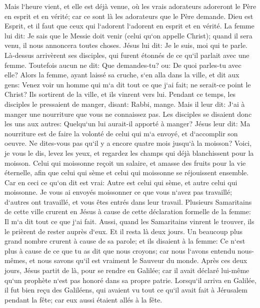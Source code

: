 \verse Mais l`heure vient, et elle est déjà venue, où les vrais adorateurs adoreront le Père en esprit et en vérité; car ce sont là les adorateurs que le Père demande. 
\verse Dieu est Esprit, et il faut que ceux qui l`adorent l`adorent en esprit et en vérité. 
\verse La femme lui dit: Je sais que le Messie doit venir (celui qu`on appelle Christ); quand il sera venu, il nous annoncera toutes choses. 
\verse Jésus lui dit: Je le suis, moi qui te parle. 
\verse Là-dessus arrivèrent ses disciples, qui furent étonnés de ce qu`il parlait avec une femme. Toutefois aucun ne dit: Que demandes-tu? ou: De quoi parles-tu avec elle? 
\verse Alors la femme, ayant laissé sa cruche, s`en alla dans la ville, et dit aux gens: 
\verse Venez voir un homme qui m`a dit tout ce que j`ai fait; ne serait-ce point le Christ? 
\verse Ils sortirent de la ville, et ils vinrent vers lui. 
\verse Pendant ce temps, les disciples le pressaient de manger, disant: Rabbi, mange. 
\verse Mais il leur dit: J`ai à manger une nourriture que vous ne connaissez pas. 
\verse Les disciples se disaient donc les uns aux autres: Quelqu`un lui aurait-il apporté à manger? 
\verse Jésus leur dit: Ma nourriture est de faire la volonté de celui qui m`a envoyé, et d`accomplir son oeuvre. 
\verse Ne dites-vous pas qu`il y a encore quatre mois jusqu`à la moisson? Voici, je vous le dis, levez les yeux, et regardez les champs qui déjà blanchissent pour la moisson. 
\verse Celui qui moissonne reçoit un salaire, et amasse des fruits pour la vie éternelle, afin que celui qui sème et celui qui moissonne se réjouissent ensemble. 
\verse Car en ceci ce qu`on dit est vrai: Autre est celui qui sème, et autre celui qui moissonne. 
\verse Je vous ai envoyés moissonner ce que vous n`avez pas travaillé; d`autres ont travaillé, et vous êtes entrés dans leur travail. 
\verse Plusieurs Samaritains de cette ville crurent en Jésus à cause de cette déclaration formelle de la femme: Il m`a dit tout ce que j`ai fait. 
\verse Aussi, quand les Samaritains vinrent le trouver, ils le prièrent de rester auprès d`eux. Et il resta là deux jours. 
\verse Un beaucoup plus grand nombre crurent à cause de sa parole; 
\verse et ils disaient à la femme: Ce n`est plus à cause de ce que tu as dit que nous croyons; car nous l`avons entendu nous-mêmes, et nous savons qu`il est vraiment le Sauveur du monde. 
\verse Après ces deux jours, Jésus partit de là, pour se rendre en Galilée; 
\verse car il avait déclaré lui-même qu`un prophète n`est pas honoré dans sa propre patrie. 
\verse Lorsqu`il arriva en Galilée, il fut bien reçu des Galiléens, qui avaient vu tout ce qu`il avait fait à Jérusalem pendant la fête; car eux aussi étaient allés à la fête. 
